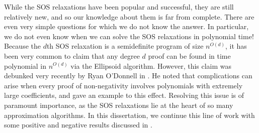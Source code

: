 While the SOS relaxations have been popular and successful, they are still relatively new, and so our knowledge about them is far from complete.
There are even very simple questions for which we do not know the answer.
In particular, we do not even know when we can solve the SOS relaxations in polynomial time!
Because the $d$th SOS relaxation is a semidefinite program of size $n^{O(d)}$, it has been very common to claim that any degree $d$ proof can be found in time polynomial in $n^{O(d)}$ via the Ellipsoid algorithm. However, this claim was debunked very recently by Ryan O'Donnell in \cite{ODon16}.
He noted that complications can arise when every proof of non-negativity involves polynomials with extremely large coefficients, and gave an example to this effect.
Resolving this issue is of paramount importance, as the SOS relaxations lie at the heart of so many approximation algorithms.
In this dissertation, we continue this line of work with some positive and negative results discussed in .

